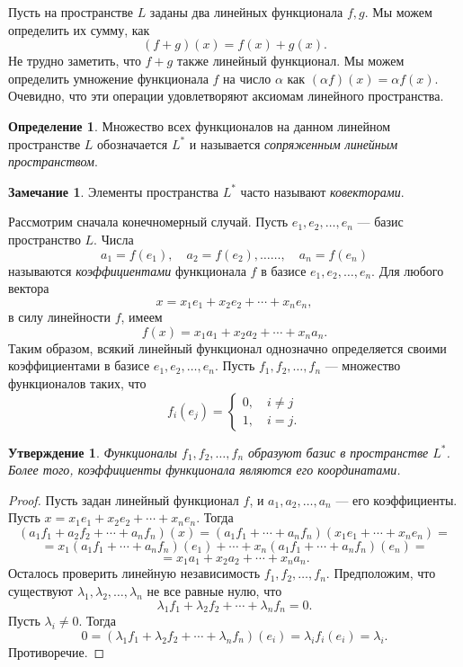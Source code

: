 \documentclass[12pt, titlepage, oneside]{amsbook}
\newtheorem{claim}[theorem]{Утверждение}
\theoremstyle{definition}
\newtheorem{definition}[theorem]{Определение}
\newtheorem{remark}[theorem]{Замечание}
\theoremstyle{remark}
\begin{document}
Пусть на пространстве $L$ заданы два линейных функционала $f,g$. Мы можем определить их сумму, как $$(f+g)(x)=f(x)+g(x).$$ Не трудно заметить, что $f+g$ также линейный функционал. Мы можем определить умножение функционала $f$ на число $\alpha$ как $(\alpha f)(x)=\alpha f(x)$. Очевидно, что эти операции удовлетворяют аксиомам линейного пространства.

\begin{definition}
	Множество всех функционалов на данном линейном пространстве $L$ обозначается $L^*$ и называется \emph{сопряженным линейным пространством}.
\end{definition}

\begin{remark}
	Элементы пространства $L^*$ часто называют \emph{ковекторами}.
\end{remark}

Рассмотрим сначала конечномерный случай. Пусть $e_1,e_2,\ldots, e_n$ --- базис пространство $L$. Числа $$a_1=f(e_1),\quad a_2=f(e_2),\ldots\ldots,\quad a_n=f(e_n)$$ называются \emph{коэффициентами} функционала $f$ в базисе $e_1,e_2,\ldots, e_n$. Для любого вектора $$x=x_1 e_1+ x_2 e_2+\cdots+x_n e_n,$$ в силу линейности $f$, имеем $$f(x)=x_1 a_1+ x_2 a_2+\cdots+x_n a_n.$$ Таким образом, всякий линейный функционал однозначно определяется своими коэффициентами в базисе $e_1,e_2,\ldots, e_n$. Пусть $f_1,f_2,\ldots, f_n$ --- множество функционалов таких, что $$f_i(e_j)=\begin{cases}0,\quad i\neq j \\
		1,\quad i=j.\end{cases}$$

\begin{claim}
	\label{LP2}
	Функционалы $f_1,f_2,\ldots, f_n$ образуют базис в пространстве $L^*$. Более того, коэффициенты функционала являются его координатами.
\end{claim}

\begin{proof}
	Пусть задан линейный функционал $f$, и $a_1,a_2,\ldots, a_n$ --- его коэффициенты. Пусть $x=x_1 e_1+ x_2 e_2+\cdots+x_n e_n$. Тогда $$(a_1 f_1+ a_2 f_2+\cdots+ a_n f_n)(x)=(a_1 f_1+\cdots+ a_n f_n)(x_1 e_1+ \cdots+x_n e_n)=$$ $$=x_1(a_1 f_1+\cdots+ a_n f_n)(e_1)+\cdots+x_n(a_1 f_1+\cdots+ a_n f_n)(e_n)=$$ $$=x_1 a_1+ x_2 a_2+\cdots+x_n a_n.$$ Осталось проверить линейную независимость $f_1,f_2,\ldots, f_n$. Предположим, что существуют $\lambda_1,\lambda_2,\ldots, \lambda_n$ не все равные нулю, что $$\lambda_1f_1+\lambda_2f_2+\cdots+\lambda_n f_n=0.$$ Пусть $\lambda_i\neq 0$. Тогда $$0=(\lambda_1f_1+\lambda_2f_2+\cdots+\lambda_n f_n)(e_i)=\lambda_if_i(e_i)=\lambda_i.$$ Противоречие.
\end{proof}
\end{document}
